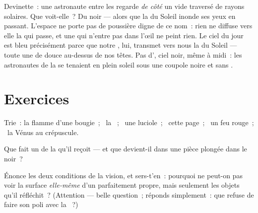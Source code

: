 \begin{remark}\label{rem:g7:light-sources-propagation:space}
Devinette~: une astronaute entre les  regarde \emph{de côté}
un vide traversé de rayons solaires. Que voit-elle~? Du noir --- alors
que la  du Soleil inonde ses yeux en passant. L'espace ne
porte pas de poussière digne de ce nom~: rien ne diffuse vers elle la
 qui passe, et une  qui n'entre pas dans l'œil ne peint
rien. Le ciel du jour est bleu précisément parce que notre , lui,
transmet vers nous la  du Soleil --- toute une  de
douce  au-dessus de nos têtes. Pas d', ciel noir, même à
midi~: les astronautes de la  se tenaient en plein soleil sous
une coupole noire et sans .
\end{remark}

\section{Exercices}

\begin{exercise}[$\star$]\label{exo:g7:light-sources-propagation:1}
Trie~: la flamme d'une bougie~; \ la ~; \ une luciole~; \ cette
page~; \ un feu rouge~; \ la  Vénus au crépuscule.
\end{exercise}

\begin{exercise}[$\star$]\label{exo:g7:light-sources-propagation:2}
Que fait un  de la  qu'il reçoit --- et que
devient-il dans une pièce plongée dans le noir~?
\end{exercise}

\begin{exercise}[$\star$]\label{exo:g7:light-sources-propagation:3}
Énonce les deux conditions de la vision, et sers-t'en~: pourquoi ne
peut-on pas voir la surface \emph{elle-même} d'un 
parfaitement propre, mais seulement les objets qu'il réfléchit~?
(Attention --- belle question~; réponds simplement~: que refuse de
faire son poli avec la ~?)
\end{exercise}

